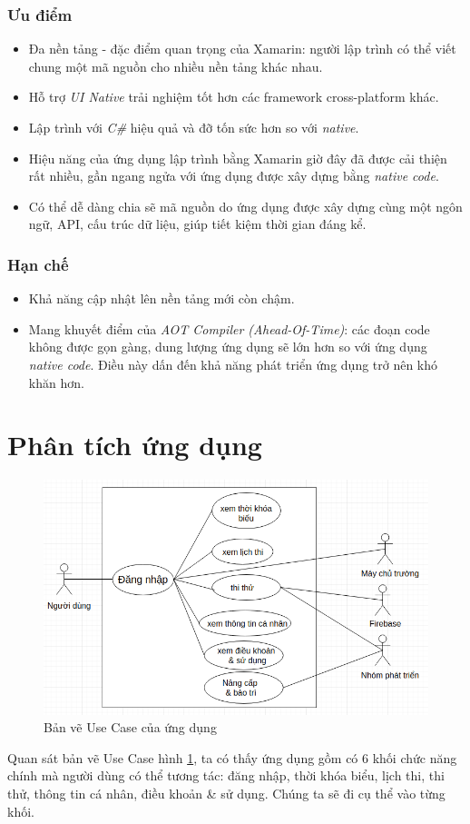 \documentclass[a4paper]{article}
\begin{document}
\subsubsection{Ưu điểm}
\begin{itemize}
    \item Đa nền tảng - đặc điểm quan trọng của Xamarin: người lập trình có thể viết chung một mã nguồn cho nhiều nền tảng khác nhau.
    \item Hỗ trợ \textit{UI Native} trải nghiệm tốt hơn các framework cross-platform khác.
    \item Lập trình với \textit{C\#} hiệu quả và đỡ tốn sức hơn so với \textit{native}.
    \item Hiệu năng của ứng dụng lập trình bằng Xamarin giờ đây đã được cải thiện rất nhiều, gần ngang ngửa với ứng dụng được xây dựng bằng \textit{native code}.
    \item Có thể dễ dàng chia sẽ mã nguồn do ứng dụng được xây dựng cùng một ngôn ngữ, API, cấu trúc dữ liệu, giúp tiết kiệm thời gian đáng kể.
\end{itemize}
\subsubsection{Hạn chế}
\begin{itemize}
    \item Khả năng cập nhật lên nền tảng mới còn chậm.
    \item Mang khuyết điểm của \textit{AOT Compiler (Ahead-Of-Time)}: các đoạn code không được gọn gàng, dung lượng ứng dụng sẽ lớn hơn so với ứng dụng \textit{native code}. Điều này dấn đến khả năng phát triển ứng dụng trở nên khó khăn hơn.
\end{itemize}
\newpage
\section{Phân tích ứng dụng}
\begin{figure}[htp]
    \centering
    \includegraphics[scale = .35]{usecase.png}
    \caption{Bản vẽ Use Case của ứng dụng}
    \label{fig:usecase}
\end{figure}
Quan sát bản vẽ Use Case hình \ref{fig:usecase}, ta có thấy ứng dụng gồm có 6 khối chức năng chính mà người dùng có thể tương tác: đăng nhập, thời khóa biểu, lịch thi, thi thử, thông tin cá nhân, điều khoản & sử dụng. Chúng ta sẽ đi cụ thể vào từng khối.
\end{document}
